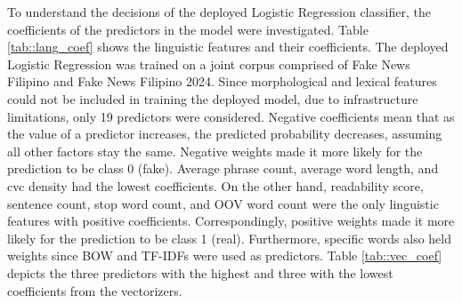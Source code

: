 To understand the decisions of the deployed Logistic Regression classifier, the coefficients of the predictors in the model were investigated. Table \ref{tab::lang_coef} shows the linguistic features and their coefficients. The deployed Logistic Regression was trained on a joint corpus comprised of Fake News Filipino and Fake News Filipino 2024. Since morphological and lexical features could not be included in training the deployed model, due to infrastructure limitations, only 19 predictors were considered. Negative coefficients mean that as the value of a predictor increases, the predicted probability decreases, assuming all other factors stay the same. Negative weights made it more likely for the prediction to be class 0 (fake). Average phrase count, average word length, and cvc density had the lowest coefficients. On the other hand, readability score, sentence count, stop word count, and OOV word count were the only linguistic features with positive coefficients. Correspondingly, positive weights made it more likely for the prediction to be class 1 (real). Furthermore, specific words also held weights since BOW and TF-IDFs were used as predictors. Table \ref{tab::vec_coef} depicts the three predictors with the highest and three with the lowest coefficients from the vectorizers. 

